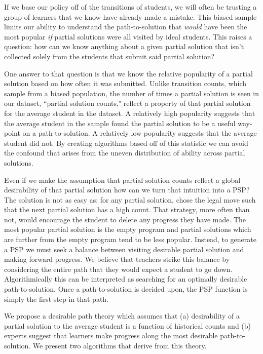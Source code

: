 If we base our policy off of the transitions of students, we will often be trusting a group of learners that we know have already made a mistake. This biased sample limits our ability to understand the path-to-solution that \emph{would} have been the most popular \emph{if} partial solutions were all visited by ideal students. This raises a question: how can we know anything about a given partial solution that isn't collected solely from the students that submit said partial solution? 

One answer to that question is that we know the relative popularity of a partial solution based on how often it was submitted. Unlike transition counts, which sample from a biased population, the number of times a partial solution is seen in our dataset, ``partial solution counts," reflect a property of that partial solution for the average student in the dataset. A relatively high popularity suggests that the average student in the sample found the partial solution to be a useful way-point on a path-to-solution. A relatively low popularity suggests that the average student did not. By creating algorithms based off of this statistic we can avoid the confound that arises from the uneven distribution of ability across partial solutions.

Even if we make the assumption that partial solution counts reflect a global desirability of that partial solution how can we turn that intuition into a PSP? The solution is not as easy as: for any partial solution, chose the legal move such that the next partial solution has a high count. That strategy, more often than not, would encourage the student to delete any progress they have made. The most popular partial solution is the empty program and partial solutions which are further from the empty program tend to be less popular. Instead, to generate a PSP we must seek a balance between visiting desirable partial solution and making forward progress. We believe that teachers strike this balance by considering the entire path that they would expect a student to go down. Algorithmically this can be interpreted as searching for an optimally desirable path-to-solution. Once a path-to-solution is decided upon, the PSP function is simply the first step in that path.

We propose a desirable path theory which assumes that (a) desirability of a partial solution to the average student is a function of historical counts and (b) experts suggest that learners make progress along the most desirable path-to-solution. We present two algorithms that derive from this theory. 

